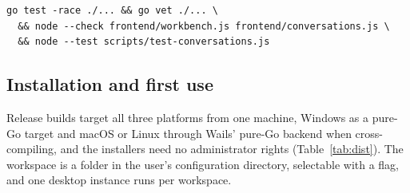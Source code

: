 \documentclass[11pt,a4paper]{article}
\begin{document}
\begin{verbatim}
go test -race ./... && go vet ./... \
  && node --check frontend/workbench.js frontend/conversations.js \
  && node --test scripts/test-conversations.js
\end{verbatim}

\subsection{Installation and first
use}\label{installation-and-first-use}

Release builds target all three platforms from one machine, Windows as a
pure-Go target and macOS or Linux through Wails' pure-Go backend when
cross-compiling, and the installers need no administrator rights (Table~\ref{tab:dist}). The workspace is a folder in the user's configuration directory,
selectable with a flag, and one desktop instance runs per workspace.
\end{document}
